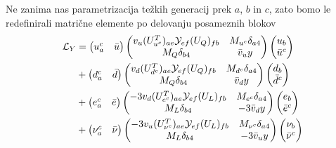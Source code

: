 Ne zanima nas parametrizacija težkih generacij prek $a$, $b$ in $c$, zato bomo le redefinirali
matrične elemente po delovanju posameznih blokov
\begin{align}
	\mathcal{L}_Y &= \begin{pmatrix}
		u^c_a & \bar{u}
	\end{pmatrix} \begin{pmatrix}
		v_u (U^T_{u^c})_{ae} \mathcal{Y}_{ef} (U_Q)_{fb} & M_{u^c}\delta_{a4} \\
		M_Q\delta_{b4} & \bar{v}_u y
	\end{pmatrix} \begin{pmatrix}
		u_b \\ \bar{u}^c
	\end{pmatrix} \notag \\
	&+ \begin{pmatrix}
		d^c_a & \bar{d}
	\end{pmatrix} \begin{pmatrix}
		v_d (U^T_{d^c})_{ae} \mathcal{Y}_{ef} (U_Q)_{fb} & M_{d^c}\delta_{a4} \\
		M_Q\delta_{b4} & \bar{v}_d y
	\end{pmatrix} \begin{pmatrix}
		d_b \\ \bar{d}^c
	\end{pmatrix} \notag \\
	&+ \begin{pmatrix}
		e_a^c & \bar{e}
	\end{pmatrix} \begin{pmatrix}
		-3v_d (U^T_{e^c})_{ae} \mathcal{Y}_{ef} (U_L)_{fb} & M_{e^c} \delta_{a4} \\
		M_L\delta_{b4} & -3\bar{v}_d y
	\end{pmatrix} \begin{pmatrix}
		e_b \\ \bar{e}^c
	\end{pmatrix} \notag \\
	&+ \begin{pmatrix}
		\nu^c_a & \bar{\nu}
	\end{pmatrix} \begin{pmatrix}
		-3 v_u (U^T_{\nu^c})_{ae} \mathcal{Y}_{ef} (U_L)_{fb} & M_{\nu^c}\delta_{a4} \\
		M_L\delta_{b4} & -3\bar{v}_u y
	\end{pmatrix} \begin{pmatrix}
		\nu_b \\ \bar{\nu}^c
	\end{pmatrix} \notag \\

\end{align}
